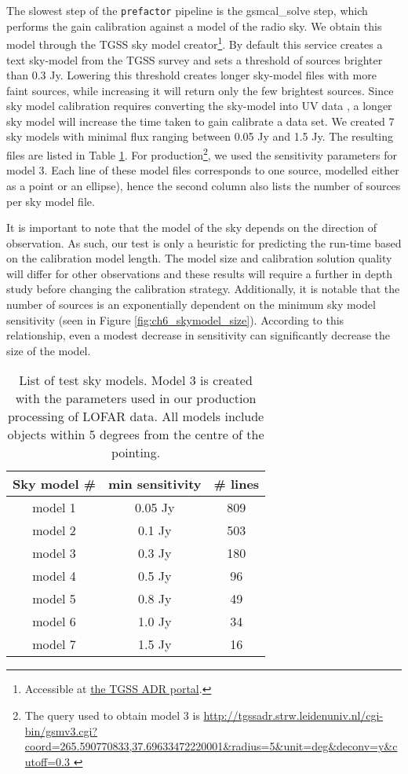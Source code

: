 The slowest step of the \texttt{prefactor} pipeline is the gsmcal\_solve step, which performs the gain calibration against a model of the radio sky. We obtain this model through the TGSS sky model creator\footnote{Accessible at \href{http://tgssadr.strw.leidenuniv.nl/doku.php}{the TGSS ADR portal}.}. By default this service creates a text sky-model from the TGSS survey \citep{tgssadr} and sets a threshold of sources brighter than 0.3 Jy. 
Lowering this threshold creates longer sky-model files with more faint sources, while increasing it will return only the few brightest sources. Since sky model calibration requires converting the sky-model into UV data \citep{dppp}, a longer sky model will increase the time taken to gain calibrate a data set. We created 7 sky models with minimal flux ranging between 0.05 Jy and 1.5 Jy. The resulting files are listed in Table \ref{table:ch6_skymodels}. 
For production\footnote{The query used to obtain model 3 is \url{http://tgssadr.strw.leidenuniv.nl/cgi-bin/gsmv3.cgi?coord=265.590770833,37.69633472220001\&radius=5\&unit=deg\&deconv=y\&cutoff=0.3 }}, we used the sensitivity parameters for model 3. Each line of these model files corresponds to one source, modelled either as a point or an ellipse), hence the second column also lists the number of sources per sky model file.

It is important to note that the model of the sky depends on the direction of observation. As such, our test is only a heuristic for predicting the run-time based on the calibration model length. The model size and calibration solution quality will differ for other observations and these results will require a further in depth study before changing the calibration strategy. Additionally, it is notable that the number of sources is an exponentially dependent on the minimum sky model sensitivity (seen in Figure \ref{fig:ch6_skymodel_size}). According to this relationship, even a modest decrease in sensitivity can significantly decrease the size of the model.

\begin{table}[!ht]
\centering
\begin{tabular}{||c| c | c||} 
 \hline
 Sky model \# & min sensitivity & \# lines  \\ [0.5ex] 
 \hline
 model 1 & 0.05 Jy & 809    \\ 
 model 2 & 0.1 Jy & 503   \\
 \rowcolor{Gray}
  \hline
 model 3 & 0.3 Jy & 180   \\
  \hline
 model 4 & 0.5 Jy & 96  \\
 model 5 & 0.8 Jy & 49   \\ 
 model 6 & 1.0 Jy & 34   \\
 model 7 & 1.5 Jy & 16   \\[1ex] 
 \hline
\end{tabular}
\caption{List of test sky models. Model 3 is created with the parameters used in our production processing of LOFAR data. All models include objects within 5 degrees from the centre of the pointing.  }
\label{table:ch6_skymodels}
\end{table}



